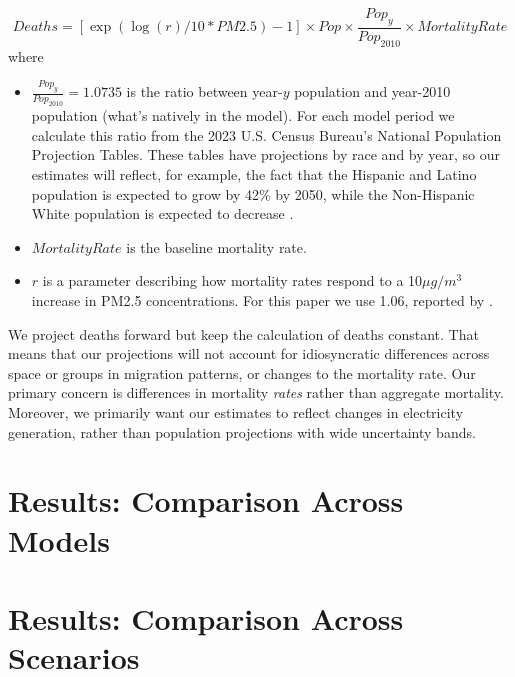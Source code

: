 \documentclass[a4paper]{article}
\theoremstyle{definition}
\theoremstyle{plain}
\begin{document}
\begin{equation}
    Deaths = [\exp(\log(r)/10*PM2.5)-1]\times Pop \times \frac{Pop_y}{Pop_{2010}} \times MortalityRate
\end{equation}
where 
\begin{itemize}
    \item $\frac{Pop_y}{Pop_{2010}}=1.0735$ is the ratio between year-$y$ population and year-2010 population (what's natively in the model).  For each model period we calculate this ratio from the 2023 U.S. Census Bureau's National Population Projection Tables.  These tables have projections by race and by year, so our estimates will reflect, for example, the fact that the Hispanic and Latino population is expected to grow by 42$\%$ by 2050, while the Non-Hispanic White population is expected to decrease \citep{Bureau2023Series}.
    \item $MortalityRate$ is the baseline mortality rate.
    \item $r$ is a parameter describing how mortality rates respond to a 10$\mu g/m^3$ increase in PM2.5 concentrations.  For this paper we use 1.06, reported by \citet{Krewski2009ExtendedInstitute}.
\end{itemize}

We project deaths forward but keep the calculation of deaths constant.  That means that our projections will not account for idiosyncratic differences across space or groups in migration patterns, or changes to the mortality rate.  Our primary concern is differences in mortality \textit{rates} rather than aggregate mortality.  Moreover, we primarily want our estimates to reflect changes in electricity generation, rather than population projections with wide uncertainty bands.
\section{Results: Comparison Across Models}

\section{Results: Comparison Across Scenarios}
\end{document}
